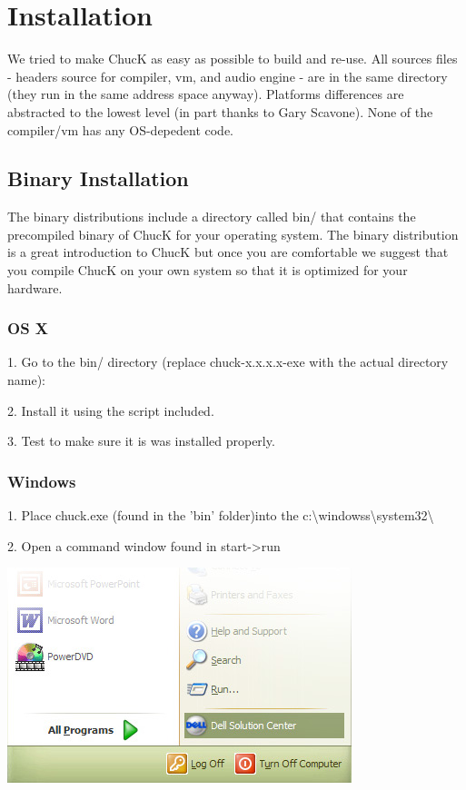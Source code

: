 \chapter{Installation}

We tried to make ChucK as easy as possible to build and re-use. All 
sources files - headers source for compiler, vm, and audio engine - are 
in the same directory (they run in the same address space anyway). Platforms 
differences are abstracted to the lowest level (in part thanks to Gary 
Scavone). None of the compiler/vm has any OS-depedent code. 

\section{Binary Installation}


The binary distributions include a directory called bin/ that contains the precompiled binary of ChucK for your operating system. The binary distribution is a great introduction to ChucK but once you are comfortable we suggest that you compile ChucK on your own system so that it is optimized for your hardware. 

\subsection{OS X}
1. Go to the bin/ directory (replace chuck-x.x.x.x-exe with the actual 
directory name):


2. Install it using the script included.


3. Test to make sure it is was installed properly.



\subsection{Windows}

1. Place chuck.exe (found in the 'bin' folder)into the c:\textbackslash windowss\textbackslash system32\textbackslash

2. Open a command window found in start-\textgreater run

\includegraphics{images/startmenu}

